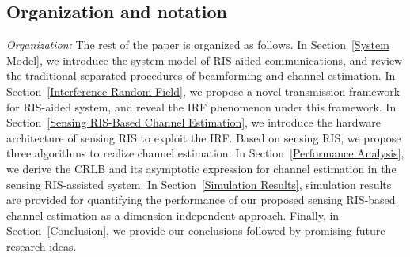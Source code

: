 \documentclass[12pt,draftclsnofoot,journal,onecolumn]{IEEEtran}
\theoremstyle{nonumberplain}
\begin{document}
\begin{itemize}
    \end{itemize}

\subsection{Organization and notation}

\textit{Organization:}
The rest of the paper is organized as follows.
In Section~\ref{System Model}, we introduce the system model of RIS-aided communications, and review the traditional separated procedures of beamforming and channel estimation.
In Section~\ref{Interference Random Field}, we propose a novel transmission framework for RIS-aided system, and reveal the \ac{IRF} phenomenon under this framework.
In Section~\ref{Sensing RIS-Based Channel Estimation}, we introduce the hardware architecture of sensing RIS to exploit the \ac{IRF}.
Based on sensing RIS, we propose three algorithms to realize channel estimation.
In Section~\ref{Performance Analysis}, we derive the \ac{CRLB} and its asymptotic expression for channel estimation in the sensing RIS-assisted system.
In Section~\ref{Simulation Results}, simulation results are provided for quantifying the performance of our proposed sensing RIS-based channel estimation as a dimension-independent approach.
Finally, in Section~\ref{Conclusion}, we provide our conclusions followed by promising future research ideas.
\end{document}
